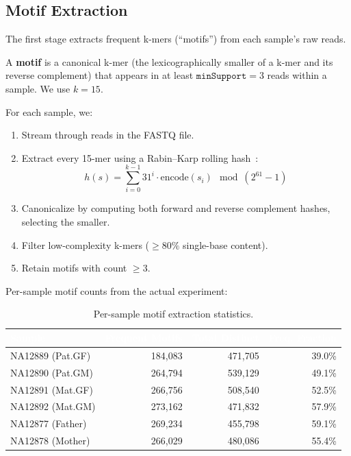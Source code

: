 \documentclass{../yalumba}
\begin{document}
\subsection{Motif Extraction}

The first stage extracts frequent k-mers (``motifs'') from each sample's
raw reads.

\begin{definition}
A \textbf{motif} is a canonical k-mer (the lexicographically smaller of a
k-mer and its reverse complement) that appears in at least
$\texttt{minSupport} = 3$ reads within a sample.  We use $k = 15$.
\end{definition}

For each sample, we:

\begin{enumerate}
  \item Stream through reads in the FASTQ file.
  \item Extract every 15-mer using a Rabin--Karp rolling
        hash~\cite{karp1987rabin}:
        \begin{equation}
          h(s) = \sum_{i=0}^{k-1} 31^i \cdot \text{encode}(s_i)
                 \mod (2^{61} - 1)
          \label{eq:rolling-hash}
        \end{equation}
  \item Canonicalize by computing both forward and reverse complement hashes,
        selecting the smaller.
  \item Filter low-complexity k-mers ($\geq 80\%$ single-base content).
  \item Retain motifs with count $\geq 3$.
\end{enumerate}

Per-sample motif counts from the actual experiment:

\begin{table}[H]
\centering
\tablestyle
\caption{Per-sample motif extraction statistics.}
\label{tab:motifs}
\begin{tabular}{@{}lrrr@{}}
\toprule
\rowcolor{table-header}
\textcolor{white}{\textbf{Sample}} &
\textcolor{white}{\textbf{Frequent Motifs}} &
\textcolor{white}{\textbf{Total Distinct}} &
\textcolor{white}{\textbf{Freq. Fraction}} \\
\midrule
NA12889 (Pat.GF) & 184{,}083 & 471{,}705 & 39.0\% \\
NA12890 (Pat.GM) & 264{,}794 & 539{,}129 & 49.1\% \\
NA12891 (Mat.GF) & 266{,}756 & 508{,}540 & 52.5\% \\
NA12892 (Mat.GM) & 273{,}162 & 471{,}832 & 57.9\% \\
NA12877 (Father) & 269{,}234 & 455{,}798 & 59.1\% \\
NA12878 (Mother) & 266{,}029 & 480{,}086 & 55.4\% \\
\bottomrule
\end{tabular}
\end{table}
\end{document}
